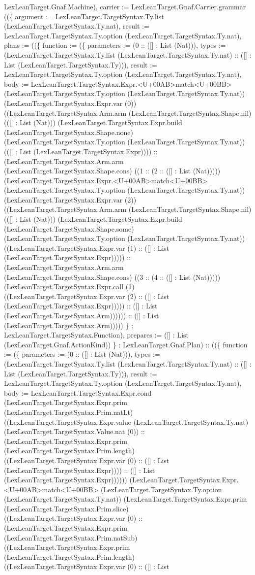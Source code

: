 \documentclass[11pt]{article}
\begin{document}
LexLeanTarget.Gnaf.Machine), carrier := LexLeanTarget.Gnaf.Carrier.grammar ((\{ argument := LexLeanTarget.TargetSyntax.Ty.list (LexLeanTarget.TargetSyntax.Ty.nat), result := LexLeanTarget.TargetSyntax.Ty.option (LexLeanTarget.TargetSyntax.Ty.nat), plans := ((\{ function := (\{ parameters := (0 :: ([] : List (Nat))), types := (LexLeanTarget.TargetSyntax.Ty.list (LexLeanTarget.TargetSyntax.Ty.nat) :: ([] : List (LexLeanTarget.TargetSyntax.Ty))), result := LexLeanTarget.TargetSyntax.Ty.option (LexLeanTarget.TargetSyntax.Ty.nat), body := LexLeanTarget.TargetSyntax.Expr.<U+00AB>match<U+00BB> (LexLeanTarget.TargetSyntax.Ty.option (LexLeanTarget.TargetSyntax.Ty.nat)) (LexLeanTarget.TargetSyntax.Expr.var (0)) ((LexLeanTarget.TargetSyntax.Arm.arm (LexLeanTarget.TargetSyntax.Shape.nil) (([] : List (Nat))) (LexLeanTarget.TargetSyntax.Expr.build (LexLeanTarget.TargetSyntax.Shape.none) (LexLeanTarget.TargetSyntax.Ty.option (LexLeanTarget.TargetSyntax.Ty.nat)) (([] : List (LexLeanTarget.TargetSyntax.Expr)))) :: (LexLeanTarget.TargetSyntax.Arm.arm (LexLeanTarget.TargetSyntax.Shape.cons) ((1 :: (2 :: ([] : List (Nat))))) (LexLeanTarget.TargetSyntax.Expr.<U+00AB>match<U+00BB> (LexLeanTarget.TargetSyntax.Ty.option (LexLeanTarget.TargetSyntax.Ty.nat)) (LexLeanTarget.TargetSyntax.Expr.var (2)) ((LexLeanTarget.TargetSyntax.Arm.arm (LexLeanTarget.TargetSyntax.Shape.nil) (([] : List (Nat))) (LexLeanTarget.TargetSyntax.Expr.build (LexLeanTarget.TargetSyntax.Shape.some) (LexLeanTarget.TargetSyntax.Ty.option (LexLeanTarget.TargetSyntax.Ty.nat)) ((LexLeanTarget.TargetSyntax.Expr.var (1) :: ([] : List (LexLeanTarget.TargetSyntax.Expr))))) :: (LexLeanTarget.TargetSyntax.Arm.arm (LexLeanTarget.TargetSyntax.Shape.cons) ((3 :: (4 :: ([] : List (Nat))))) (LexLeanTarget.TargetSyntax.Expr.call (1) ((LexLeanTarget.TargetSyntax.Expr.var (2) :: ([] : List (LexLeanTarget.TargetSyntax.Expr))))) :: ([] : List (LexLeanTarget.TargetSyntax.Arm)))))) :: ([] : List (LexLeanTarget.TargetSyntax.Arm))))) \} : LexLeanTarget.TargetSyntax.Function), prepares := ([] : List (LexLeanTarget.Gnaf.ActionKind)) \} : LexLeanTarget.Gnaf.Plan) :: ((\{ function := (\{ parameters := (0 :: ([] : List (Nat))), types := (LexLeanTarget.TargetSyntax.Ty.list (LexLeanTarget.TargetSyntax.Ty.nat) :: ([] : List (LexLeanTarget.TargetSyntax.Ty))), result := LexLeanTarget.TargetSyntax.Ty.option (LexLeanTarget.TargetSyntax.Ty.nat), body := LexLeanTarget.TargetSyntax.Expr.cond (LexLeanTarget.TargetSyntax.Expr.prim (LexLeanTarget.TargetSyntax.Prim.natLt) ((LexLeanTarget.TargetSyntax.Expr.value (LexLeanTarget.TargetSyntax.Ty.nat) (LexLeanTarget.TargetSyntax.Value.nat (0)) :: (LexLeanTarget.TargetSyntax.Expr.prim (LexLeanTarget.TargetSyntax.Prim.length) ((LexLeanTarget.TargetSyntax.Expr.var (0) :: ([] : List (LexLeanTarget.TargetSyntax.Expr)))) :: ([] : List (LexLeanTarget.TargetSyntax.Expr)))))) (LexLeanTarget.TargetSyntax.Expr.<U+00AB>match<U+00BB> (LexLeanTarget.TargetSyntax.Ty.option (LexLeanTarget.TargetSyntax.Ty.nat)) (LexLeanTarget.TargetSyntax.Expr.prim (LexLeanTarget.TargetSyntax.Prim.slice) ((LexLeanTarget.TargetSyntax.Expr.var (0) :: (LexLeanTarget.TargetSyntax.Expr.prim (LexLeanTarget.TargetSyntax.Prim.natSub) ((LexLeanTarget.TargetSyntax.Expr.prim (LexLeanTarget.TargetSyntax.Prim.length) ((LexLeanTarget.TargetSyntax.Expr.var (0) :: ([] : List 
\end{document}

